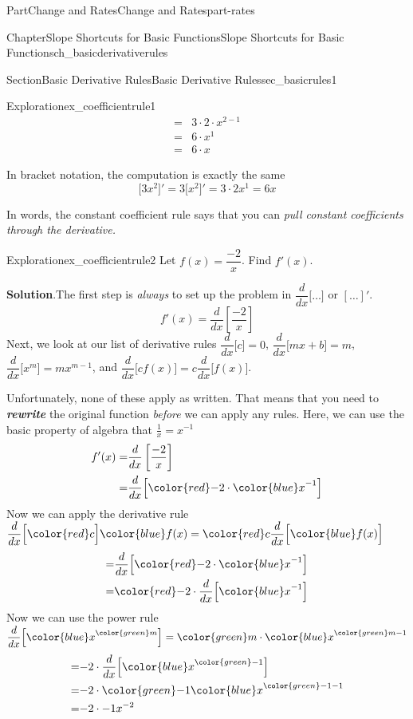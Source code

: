 \documentclass{tufte-book}
\newcommand{\blocktitlefont}{\relax}
\newcommand{\alert}[1]{\textbf{\textit{#1}}}
\numberwithin{equation}{chapter}
\newcommand{\red}[1]{   {\color{red}   #1}   }
\newcommand{\blue}[1]{  {\color{blue}  #1}  }
\newcommand{\green}[1]{ {\color{green} #1} }
\newcommand{\ddx}[1]{ \dfrac{d}{dx} \Big[ #1 \Big]  }
\newcommand{\ddxfrac}[1]{ \dfrac{d}{dx} \left[ #1 \right]  }
\newcommand{\D}[1]{ \Big[ #1 \Big]'  }
\newcommand{\amp}{&}
\begin{document}
\begin{partptx}{Part}{Change and Rates}{}{Change and Rates}{}{}{part-rates}
\begin{chapterptx}{Chapter}{Slope Shortcuts for Basic Functions}{}{Slope Shortcuts for Basic Functions}{}{}{ch_basicderivativerules}
\begin{sectionptx}{Section}{Basic Derivative Rules}{}{Basic Derivative Rules}{}{}{sec_basicrules1}
\begin{exploration}{Exploration}{}{ex_coefficientrule1}
\begin{align*}
= \amp 3 \cdot 2\cdot x^{2-1}\\
= \amp 6\cdot x^{1}\\
= \amp 6\cdot x
\end{align*}
%
\par
In bracket notation, the computation is exactly the same%
\begin{equation*}
\D{3x^2} = 3\D{x^2} = 3\cdot 2 x^1 = 6x
\end{equation*}
%
\end{exploration}%
In words, the constant coefficient rule says that you can \emph{pull constant coefficients through the derivative.}%
\begin{exploration}{Exploration}{}{ex_coefficientrule2}%
Let \(f(x) = \dfrac{-2}{x}\). Find \(f'(x)\).%
\par\smallskip%
\noindent\textbf{\blocktitlefont Solution}.\hypertarget{ex_coefficientrule2-2}{}\quad{}The first step is \emph{always} to set up the problem in \(\ddx{\dots}\) or \([ \dots ]'\).%
\begin{equation*}
f'(x) = \ddxfrac{ \dfrac{-2}{x} }
\end{equation*}
Next, we look at our list of derivative rules \(\ddx{c}=0\), \(\ddx{mx+b}=m\), \(\ddx{x^m}=mx^{m-1}\), and \(\ddx{ cf(x)}=c\ddx{f(x)}\).%
\par
Unfortunately, none of these apply as written. That  means that you need to \alert{rewrite} the original function \emph{before} we can apply any rules. Here, we can use  the basic property of algebra that \(\frac{1}{x} = x^{-1}\)%
\begin{align*}
f'(x)  = \amp  \ddxfrac{ \dfrac{-2}{x} }\\
= \amp \ddx{ {\red -2} \cdot {\blue x^{-1} } }
\end{align*}
Now we can apply the derivative rule \(\ddx{ \red c} {\blue f(x) } = {\red c} \ddx{\blue f(x) }\)%
\begin{align*}
= \amp \ddx{ {\red -2} \cdot { \blue x^{-1} } }\\
= \amp {\red -2} \cdot \ddx{ {\blue x^{-1} } }
\end{align*}
Now we can use the power rule \(\ddx{ {\blue x}^{\green m} } = {\green m}\cdot {\blue x}^{{\green m}-1} \)%
\begin{align*}
= \amp { -2} \cdot \ddx{ {\blue x}^{\green -1}  }\\
= \amp { -2} \cdot {\green -1} { {\blue x}^{{\green -1} -1 }  }\\
= \amp { -2} \cdot { -1} { { x}^{-2 }  }\\

\end{align*}
\end{exploration}
\end{sectionptx}
\end{chapterptx}
\end{partptx}
\end{document}
